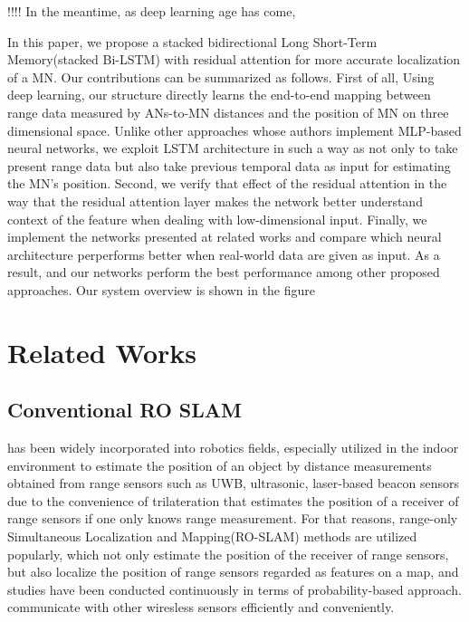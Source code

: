 \documentclass[letterpaper, 10 pt, conference]{ieeeconf}  %
\begin{document}
\cite{lim2018effective}
!!!!
In the meantime, as deep learning age has come\cite{lecun2015deep},

In this paper, we propose a stacked bidirectional Long Short-Term Memory(stacked Bi-LSTM) with residual attention for more accurate localization of a MN. Our contributions can be summarized as follows. First of all, Using deep learning, our structure directly learns the end-to-end mapping between range data measured by ANs-to-MN distances and the position of MN on three dimensional space. Unlike other approaches whose authors implement MLP-based neural networks, we exploit LSTM architecture in such a way as not only to take present range data but also take previous temporal data as input for estimating the MN's position. Second, we verify that effect of the residual attention in the way that the residual attention layer makes the network better understand context of the feature when dealing with low-dimensional input. Finally, we implement the networks presented at related works and compare which neural architecture perperforms better when real-world data are given as input. As a result, and our networks perform the best performance among other proposed approaches. Our system overview is shown in the figure 


\section{Related Works}
\subsection{Conventional RO SLAM}

has been widely incorporated into robotics fields, especially utilized in the indoor environment to estimate the position of an object by distance measurements obtained from range sensors such as UWB, ultrasonic, laser-based beacon sensors \cite{thomas2005revisiting, cho2010mobile,raghavan2010accurate} due to the convenience of trilateration that estimates the position of a receiver of range sensors if one only knows range measurement. For that reasons, range-only Simultaneous Localization and Mapping(RO-SLAM) methods are utilized popularly, which not only estimate the position of the receiver of range sensors, but also localize the position of range sensors regarded as features on a map, and studies have been conducted continuously in terms of probability-based approach\cite{blanco2008pure,blanco2008efficient,fabresse2013undelayed, shetty2018particle}. communicate with other wiresless sensors efficiently and conveniently. 
\end{document}
